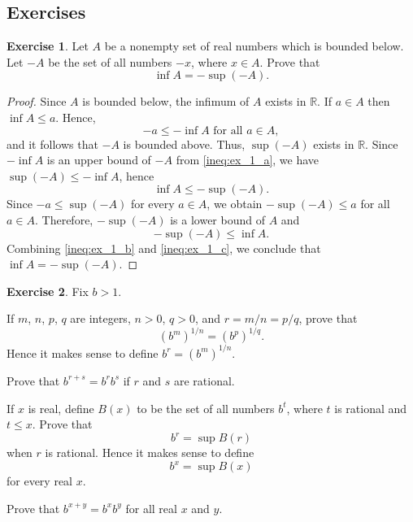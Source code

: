 \documentclass[11pt]{article}
\theoremstyle{definition}
\newtheorem{exercise}{Exercise}
\theoremstyle{plain}
\theoremstyle{remark}
\newcommand{\R}{\mathbb{R}}
\begin{document}
\subsection*{Exercises}
\begin{exercise}
Let $A$ be a nonempty set of real numbers which is bounded below.
Let $-A$ be the set of all numbers $-x$, where $x \in A$.
Prove that \[\inf A = -\sup (-A).\]
\end{exercise}
\begin{proof}
Since $A$ is bounded below, the infimum of $A$ exists in $\R$. 
If $a \in A$ then $\inf A \leq a$. Hence,
\begin{equation}\label{ineq:ex_1_a}
-a \leq -\inf A \text{ for all } a \in A,
\end{equation}
and it follows that $-A$ is bounded above. Thus, $\sup (-A)$ exists in $\R$.
Since $- \inf A$ is an upper bound of $-A$ from \eqref{ineq:ex_1_a}, we have $\sup (-A) \leq -\inf A$, hence 
\begin{equation}\label{ineq:ex_1_b}
\inf A \leq -\sup(-A).
\end{equation}
Since $-a \leq \sup(-A)$ for every $a \in A$, we obtain $-\sup (-A) \leq a$ for all $a \in A$.
Therefore, $-\sup(-A)$ is a lower bound of $A$ and 
\begin{equation}\label{ineq:ex_1_c}
-\sup(-A) \leq  \inf A.
\end{equation}
Combining \eqref{ineq:ex_1_b} and \eqref{ineq:ex_1_c}, we conclude that $\inf A = -\sup (-A)$.
\end{proof}
\begin{exercise}
Fix $b>1$.
\item[(a)] If $m$, $n$, $p$, $q$ are integers, $n>0$, $q>0$, and $r=m/n=p/q$, prove that 
 \[
 (b^m)^{1/n}=(b^p)^{1/q}.
 \]
 Hence it makes sense to define $b^r = (b^m)^{1/n}$.
 \item[(b)] Prove that $b^{r+s} = b^r b^s$ if $r$ and $s$ are rational.
 \item[(c)] If $x$ is real, define $B(x)$ to be the set of all numbers $b^t$, where $t$ is rational and $t \leq x$. 
Prove that \[b^r = \sup B(r)\] when $r$ is rational.
Hence it makes sense to define \[b^x = \sup B(x)\] for every real $x$.
\item[(d)] Prove that $b^{x+y}=b^xb^y$ for all real $x$ and $y$.

\end{exercise}
\end{document}
